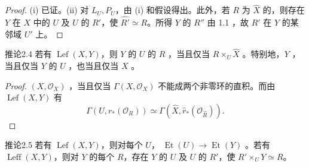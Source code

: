 \begin{proof}
(i) 已证。(ii) 对 $L_U,P_U$，由 (i) 和假设得出。此外，若 $R$ 为 $\widehat X$ 的，则存在 $Y$ 在 $X$ 中的 $U$ 及 $U$ 的 $R'$，使 $\widehat{R'}\simeq R$。所得 $Y$ 的 $R''$ 由 1.1 ，故 $R'$ 在 $Y$ 的某邻域 $U'$ 上。
\end{proof}
\begin{SGAresult}{推论}{2.4}
若有 $\operatorname{Lef}(X,Y)$，则 $Y$ 的 $U$ 的 $R$ ，当且仅当 $R\times_U\widehat X$ 。特别地，$Y$ ，当且仅当 $Y$ 的 $U$ ，也当且仅当 $X$ 。
\end{SGAresult}
\begin{proof}
 $(X,\mathcal O_X)$ ，当且仅当 $\Gamma(X,\mathcal O_X)$ 不能成两个非零环的直积。而由 $\operatorname{Lef}(X,Y)$ 有
\[\Gamma(U,r_*(\mathcal O_R))\simeq\Gamma(\widehat X,\widehat r_*(\mathcal O_{\widehat R})).\]
\end{proof}
\begin{SGAresult}{推论}{2.5}
若有 $\operatorname{Lef}(X,Y)$，则对每个 $U$， $\operatorname{Et}(U)\to\operatorname{Et}(Y)$ 。若有 $\operatorname{Leff}(X,Y)$，则对 $Y$ 的每个 $R$，存在 $Y$ 的 $U$ 及 $U$ 的 $R'$，使 $R'\times_UY\simeq R$。
\end{SGAresult}
